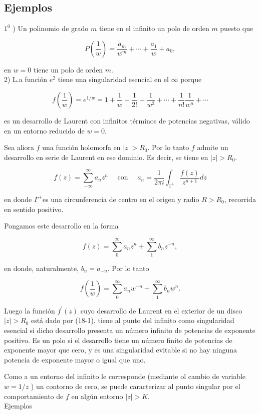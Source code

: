 \documentclass[10pt]{article}
\theoremstyle{plain}
\theoremstyle{definition}
\theoremstyle{remark}
\begin{document}
\subsection{Ejemplos}
$1^{0}$ ) Un polinomio de grado $m$ tiene en el infinito un polo de orden $m$ puesto que

$$
P\left(\frac{1}{w}\right)=\frac{a_{m}}{w^{m}}+\cdots+\frac{a_{1}}{w}+a_{0},
$$

en $w=0$ tiene un polo de orden $m$.\\
2) L.a función $e^{2}$ tiene una singularidad esencial en el $\infty$ porque

$$
f\left(\frac{1}{w}\right)=e^{1 / w}=1+\frac{1}{w}+\frac{1}{2!}+\frac{1}{w^{2}}+\cdots+\frac{1}{n!} \frac{1}{w^{n}}+\cdots
$$

es un desarrollo de Laurent con infinitos términos de potencias negativas, válido en un entorno reducido de $w=0$.

Sea aliora $f$ una función holomorfa en $|z|>R_{0}$. Por lo tanto $f$ admite un desarrollo en serie de Laurent en ese dominio. Es decir, se tiene en $|z|>R_{0}$.

$$
f(z)=\sum_{-\infty}^{\infty} a_{n} z^{n} \quad \text { con } \quad a_{n}=\frac{1}{2 \pi i} \int_{1^{+}} \frac{f(z)}{z^{n+1}} d z
$$

en donde $\Gamma^{+}$es una circunferencia de centro en el origen y radio $R>R_{0}$, recorrida en sentido positivo.

Pongamos este desarrollo en la forma


\begin{equation*}
f(z)=\sum_{0}^{\infty} a_{n} z^{n}+\sum_{1}^{\infty} b_{n} z^{-n}, \tag{18-1}
\end{equation*}


en donde, naturalmente, $b_{n}=a_{-n}$. Por lo tanto

$$
f\left(\frac{1}{w}\right)=\sum_{0}^{\infty} a_{n} w^{-n}+\sum_{1}^{\infty} b_{n} w^{n} .
$$

Luego la función $f^{\prime}(z)$ cuyo desarrollo de Laurent en el exterior de un disco $|z|>R_{0}$ está dado por (18-1), tiene al punto del infinito como singularidad esencial si dicho desarrollo presenta un número infinito de potencias de exponente positivo. Es un polo si el desarrollo tiene un número finito de potencias de exponente mayor que cero, y es una singularidad evitable si no hay ninguna potencia de exponente mayor o igual que uno.

Como a un entorno del infinito le corresponde (mediante ol cambio de variable $w=1 / z$ ) un contorno de cero, se puede caracterizar al punto singular por el comportamiento de $f$ en algún entorno $|z|>K$.\\
Ejemplos
\end{document}
